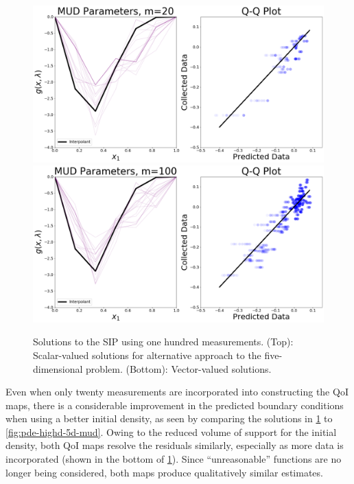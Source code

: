 \begin{figure}
\centering
[TK - change figures to omit Q-Q, change savenames (pair = scalar|vector)]
  \includegraphics[width=0.95\linewidth]{figures/pde-highd/pde-highd_pair_D-alt-5-1_m20.png}
  \includegraphics[width=0.95\linewidth]{figures/pde-highd/pde-highd_pair_D-alt-5-1_m100.png}
\caption{Solutions to the SIP using one hundred measurements.
(Top): Scalar-valued solutions for alternative approach to the five-dimensional problem.
(Bottom): Vector-valued solutions.
}
\label{fig:pde-highd-5d-alt-mud}
\end{figure}

Even when only twenty measurements are incorporated into constructing the QoI maps, there is a considerable improvement in the predicted boundary conditions when using a better initial density, as seen by comparing the solutions in \ref{fig:pde-highd-5d-alt-mud} to \ref{fig:pde-highd-5d-mud}.
Owing to the reduced volume of support for the initial density, both QoI maps resolve the residuals similarly, especially as more data is incorporated (shown in the bottom of \ref{fig:pde-highd-5d-alt-mud}).
Since ``unreasonable'' functions are no longer being considered, both maps produce qualitatively similar estimates.

